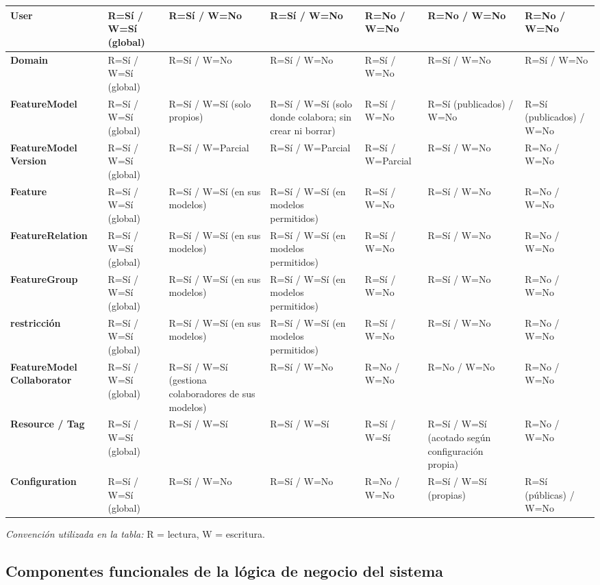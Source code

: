 \begin{longtable}{|p{2.3cm}|p{2.0cm}|p{2.0cm}|p{2.0cm}|p{2.0cm}|p{2.0cm}|p{1.9cm}|}
\textbf{User} & R=Sí / W=Sí (global) & R=Sí / W=No & R=Sí / W=No & R=No / W=No & R=No / W=No & R=No / W=No \\
\hline
\textbf{Domain} & R=Sí / W=Sí (global) & R=Sí / W=No & R=Sí / W=No & R=Sí / W=No & R=Sí / W=No & R=Sí / W=No \\
\hline
\textbf{FeatureModel} & R=Sí / W=Sí (global) & R=Sí / W=Sí (solo propios) & R=Sí / W=Sí (solo donde colabora; sin crear ni borrar) & R=Sí / W=No & R=Sí (publicados) / W=No & R=Sí (publicados) / W=No \\
\hline
\textbf{FeatureModel Version} & R=Sí / W=Sí (global) & R=Sí / W=Parcial & R=Sí / W=Parcial & R=Sí / W=Parcial & R=Sí / W=No & R=No / W=No \\
\hline
\textbf{Feature} & R=Sí / W=Sí (global) & R=Sí / W=Sí (en sus modelos) & R=Sí / W=Sí (en modelos permitidos) & R=Sí / W=No & R=Sí / W=No & R=No / W=No \\
\hline
\textbf{FeatureRelation} & R=Sí / W=Sí (global) & R=Sí / W=Sí (en sus modelos) & R=Sí / W=Sí (en modelos permitidos) & R=Sí / W=No & R=Sí / W=No & R=No / W=No \\
\hline
\textbf{FeatureGroup} & R=Sí / W=Sí (global) & R=Sí / W=Sí (en sus modelos) & R=Sí / W=Sí (en modelos permitidos) & R=Sí / W=No & R=Sí / W=No & R=No / W=No \\
\hline
\textbf{restricción} & R=Sí / W=Sí (global) & R=Sí / W=Sí (en sus modelos) & R=Sí / W=Sí (en modelos permitidos) & R=Sí / W=No & R=Sí / W=No & R=No / W=No \\
\hline
\textbf{FeatureModel Collaborator} & R=Sí / W=Sí (global) & R=Sí / W=Sí (gestiona colaboradores de sus modelos) & R=Sí / W=No & R=No / W=No & R=No / W=No & R=No / W=No \\
\hline
\textbf{Resource / Tag} & R=Sí / W=Sí (global) & R=Sí / W=Sí & R=Sí / W=Sí & R=Sí / W=Sí & R=Sí / W=Sí (acotado según configuración propia) & R=No / W=No \\
\hline
\textbf{Configuration} & R=Sí / W=Sí (global) & R=Sí / W=No & R=Sí / W=No & R=No / W=No & R=Sí / W=Sí (propias) & R=Sí (públicas) / W=No \\
\hline
\end{longtable}

\noindent\textit{Convención utilizada en la tabla:} R = lectura, W = escritura.


\subsection{Componentes funcionales de la lógica de negocio del sistema}


